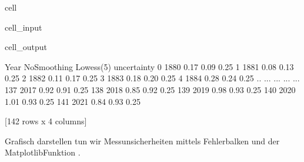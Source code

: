 \documentclass[letterpaper,10pt,english]{jupyterBook}
\begin{document}
\begin{sphinxuseclass}{cell}\begin{sphinxVerbatimInput}

\begin{sphinxuseclass}{cell_input}
\begin{sphinxVerbatim}[commandchars=\\\{\}]
\PYG{p}{[}\PYG{p}{]}  
\end{sphinxVerbatim}

\end{sphinxuseclass}\end{sphinxVerbatimInput}
\begin{sphinxVerbatimOutput}

\begin{sphinxuseclass}{cell_output}
\begin{sphinxVerbatim}[commandchars=\\\{\}]
     Year  No\PYGZus{}Smoothing  Lowess(5)  uncertainty
0    1880         \PYGZhy{}0.17      \PYGZhy{}0.09         0.25
1    1881         \PYGZhy{}0.08      \PYGZhy{}0.13         0.25
2    1882         \PYGZhy{}0.11      \PYGZhy{}0.17         0.25
3    1883         \PYGZhy{}0.18      \PYGZhy{}0.20         0.25
4    1884         \PYGZhy{}0.28      \PYGZhy{}0.24         0.25
..    ...           ...        ...          ...
137  2017          0.92       0.91         0.25
138  2018          0.85       0.92         0.25
139  2019          0.98       0.93         0.25
140  2020          1.01       0.93         0.25
141  2021          0.84       0.93         0.25

[142 rows x 4 columns]
\end{sphinxVerbatim}

\end{sphinxuseclass}\end{sphinxVerbatimOutput}

\end{sphinxuseclass}
\sphinxAtStartPar
Grafisch darstellen tun wir Messunsicherheiten mittels Fehlerbalken und der Matplotlib\sphinxhyphen{}Funktion .
\end{document}
